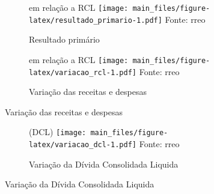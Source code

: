 \documentclass[twocolumn, a4paper, 10pt]{report}
\newcommand{\source}[1]{\scriptsize{Fonte: #1}\\}
\newcommand{\subcap}[1]{{\scriptsize\color{primarycolor}#1\newline}}
\begin{document}
    \begin{figure}[!h]
    \begin{subfigure}{\linewidth}
    \caption{Resultado primário\label{fig:resultado_primario}}
    \subcap{em relação a RCL}
    \texttt{[image: main\_files/figure-latex/resultado\_primario-1.pdf]}
    \source{\acrshort{rreo}}
    \end{subfigure}

    \begin{subfigure}{\linewidth}
    \caption{Variação das receitas e despesas\label{fig:variacao_rcl}}
    \subcap{em relação a RCL}
    \texttt{[image: main\_files/figure-latex/variacao\_rcl-1.pdf]}
    \source{\acrshort{rreo}}
    \end{subfigure}
    \end{figure}

    \begin{figure}[!h]
    \begin{subfigure}{\linewidth}
    \caption{Variação da Dívida Consolidada Liquida\label{fig:variacao_dcl}}
    \subcap{(DCL)}
    \texttt{[image: main\_files/figure-latex/variacao\_dcl-1.pdf]}
    \source{\acrshort{rreo}}
    \end{subfigure}
    \end{figure}

    
\end{document}
